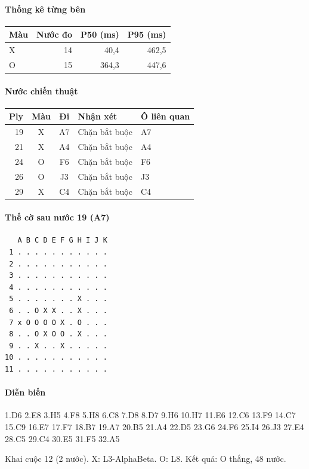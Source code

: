 \paragraph{Thống kê từng bên}
\begin{center}\small
\begin{tabular}{@{}lrrr@{}}
\toprule
Màu & Nước đo & P50 (ms) & P95 (ms) \\
\midrule
X & 14 & 40,4 & 462,5 \\
O & 15 & 364,3 & 447,6 \\
\bottomrule
\end{tabular}
\end{center}
\paragraph{Nước chiến thuật}
\begin{center}\small
\begin{tabular}{@{}rccll@{}}
\toprule
Ply & Màu & Đi & Nhận xét & Ô liên quan \\
\midrule
19 & X & A7 & Chặn bắt buộc & A7 \\
21 & X & A4 & Chặn bắt buộc & A4 \\
24 & O & F6 & Chặn bắt buộc & F6 \\
26 & O & J3 & Chặn bắt buộc & J3 \\
29 & X & C4 & Chặn bắt buộc & C4 \\
\bottomrule
\end{tabular}
\end{center}
\paragraph{Thế cờ sau nước 19 (A7)}
\begin{verbatim}
   A B C D E F G H I J K
 1 . . . . . . . . . . .
 2 . . . . . . . . . . .
 3 . . . . . . . . . . .
 4 . . . . . . . . . . .
 5 . . . . . . . X . . .
 6 . . O X X . . X . . .
 7 x O O O O X . O . . .
 8 . . O X O O . X . . .
 9 . . X . . X . . . . .
10 . . . . . . . . . . .
11 . . . . . . . . . . .
\end{verbatim}
\paragraph{Diễn biến}
{\footnotesize 1.D6 2.E8 3.H5 4.F8 5.H8 6.C8 7.D8 8.D7 9.H6 10.H7 11.E6 12.C6 13.F9 14.C7 15.C9 16.E7 17.F7 18.B7 19.A7 20.B5 21.A4 22.D5 23.G6 24.F6 25.I4 26.J3 27.E4 28.C5 29.C4 30.E5 31.F5 32.A5\par}
Khai cuộc 12 (2 nước). X: L3-AlphaBeta. O: L8. Kết quả: O thắng, 48 nước.
